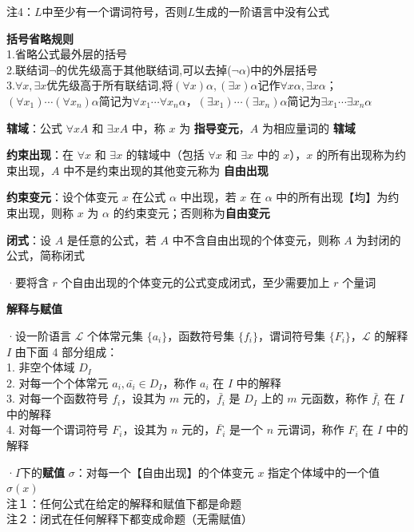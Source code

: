 注4：$L$中至少有一个谓词符号，否则$L$生成的一阶语言中没有公式

\textbf{括号省略规则}\\
1.省略公式最外层的括号\\
2.联结词$\lnot$的优先级高于其他联结词,可以去掉($\neg\alpha$)中的外层括号\\
3.$\forall x, \exists x$优先级高于所有联结词,将$(\forall x)\alpha, (\exists x)\alpha$记作$\forall x \alpha, \exists x \alpha$；$(\forall x_1) \cdots (\forall x_n)\alpha$简记为$\forall x_1 \cdots \forall x_n \alpha$，$(\exists x_1) \cdots (\exists x_n)\alpha$简记为$\exists x_1 \cdots \exists x_n \alpha$

\textbf{辖域}：公式 $\forall x A$ 和 $\exists x A$ 中，称 $x$ 为 \textbf{指导变元}，$A$ 为相应量词的 \textbf{辖域}

\textbf{约束出现}：在 $\forall x$ 和 $\exists x$ 的辖域中（包括 $\forall x$ 和 $\exists x$ 中的 $x$），$x$ 的所有出现称为约束出现，$A$ 中不是约束出现的其他变元称为 \textbf{自由出现}

\textbf{约束变元}：设个体变元 $x$ 在公式 $\alpha$ 中出现，若 $x$ 在 $\alpha$ 中的所有出现【均】为约束出现，则称 $x$ 为 $\alpha$ 的约束变元；否则称为\textbf{自由变元}


\textbf{闭式}：设 $A$ 是任意的公式，若 $A$ 中不含自由出现的个体变元，则称 $A$ 为封闭的公式，简称闭式

·要将含 $r$ 个自由出现的个体变元的公式变成闭式，至少需要加上 $r$ 个量词

\textbf{解释与赋值}

·设一阶语言 $\mathcal{L}$ 个体常元集 $\{ a_{i} \}$，函数符号集 $\{ f_{i} \}$，谓词符号集 $\{ F_{i} \}$，$\mathcal{L}$ 的解释 $I$ 由下面 4 部分组成：\\
1. 非空个体域 $D_I$\\
2. 对每一个个体常元 $a_i, \bar{a_{i}} \in D_I$，称作 $a_{i}$ 在 $I$ 中的解释\\
3. 对每一个函数符号 $f_{i}$，设其为 $m$ 元的，$\bar{f_{i}}$ 是 $D_I$ 上的 $m$ 元函数，称作 $\bar{f_{i}}$ 在 $I$ 中的解释\\
4. 对每一个谓词符号 $F_{i}$，设其为 $n$ 元的，$\bar{F_{i}}$ 是一个 $n$ 元谓词，称作 $F_{i}$ 在 $I$ 中的解释

·$I$下的\textbf{赋值} $\sigma$：对每一个【自由出现】的个体变元 $x$ 指定个体域中的一个值 $\sigma(x)$\\
\fontsize{4pt}{5pt}
注１：任何公式在给定的解释和赋值下都是命题\\
注２：闭式在任何解释下都变成命题（无需赋值）

